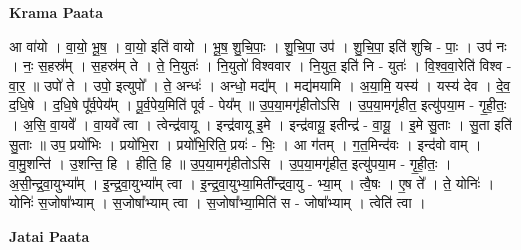 \documentclass[17pt]{extarticle}
\begin{document}
\textbf{Krama Paata} \newline

आ वा॑यो । वा॒यो॒ भू॒ष॒ । वा॒यो॒ इति॑ वायो । भू॒ष॒ शु॒चि॒पाः॒ । शु॒चि॒पा॒ उप॑ । शु॒चि॒पा॒ इति॑ शुचि - पाः॒ । उप॑ नः । नः॒ स॒हस्र᳚म् । स॒हस्र॑म् ते । ते॒ नि॒युतः॑ । नि॒युतो॑ विश्ववार । नि॒युत॒ इति॑ नि - युतः॑ । वि॒श्व॒वा॒रेति॑ विश्व - वा॒र॒ ॥ उपो॑ ते । उपो॒ इत्युपो᳚ । ते॒ अन्धः॑ । अन्धो॒ मद्य᳚म् । मद्य॑मयामि । अ॒या॒मि॒ यस्य॑ । यस्य॑ देव । दे॒व॒ द॒धि॒षे । द॒धि॒षे पू᳚र्व॒पेय᳚म् । पू॒र्व॒पेय॒मिति॑ पूर्व - पेय᳚म् ॥ उ॒प॒या॒मगृ॑हीतोऽसि । उ॒प॒या॒मगृ॑हीत॒ इत्यु॑पया॒म - गृ॒ही॒तः॒ । अ॒सि॒ वा॒यवे᳚ । वा॒यवे᳚ त्वा । त्वेन्द्र॑वायू । इन्द्र॑वायू इ॒मे । इन्द्र॑वायू॒ इतीन्द्र॑ - वा॒यू॒ । इ॒मे सु॒ताः । सु॒ता इति॑ सु॒ताः ॥ उप॒ प्रयो॑भिः । प्रयो॑भि॒रा । प्रयो॑भि॒रिति॒ प्रयः॑ - भिः॒ । आ ग॑तम् । ग॒त॒मिन्द॑वः । इन्द॑वो वाम् । वा॒मु॒शन्ति॑ । उ॒शन्ति॒ हि । हीति॒ हि ॥ उ॒प॒या॒मगृ॑हीतोऽसि । उ॒प॒या॒मगृ॑हीत॒ इत्यु॑पया॒म - गृ॒ही॒तः॒ । अ॒सी॒न्द्र॒वा॒युभ्या᳚म् । इ॒न्द्र॒वा॒युभ्या᳚म् त्वा । इ॒न्द्र॒वा॒युभ्या॒मिती᳚न्द्रवा॒यु - भ्या॒म् । त्वै॒षः । ए॒ष ते᳚ । ते॒ योनिः॑ । योनिः॑ स॒जोषा᳚भ्याम् । स॒जोषा᳚भ्याम् त्वा । स॒जोषा᳚भ्या॒मिति॑ स - जोषा᳚भ्याम् । 
त्वेति॑ त्वा । \newline

\textbf{Jatai Paata} \newline
\end{document}
